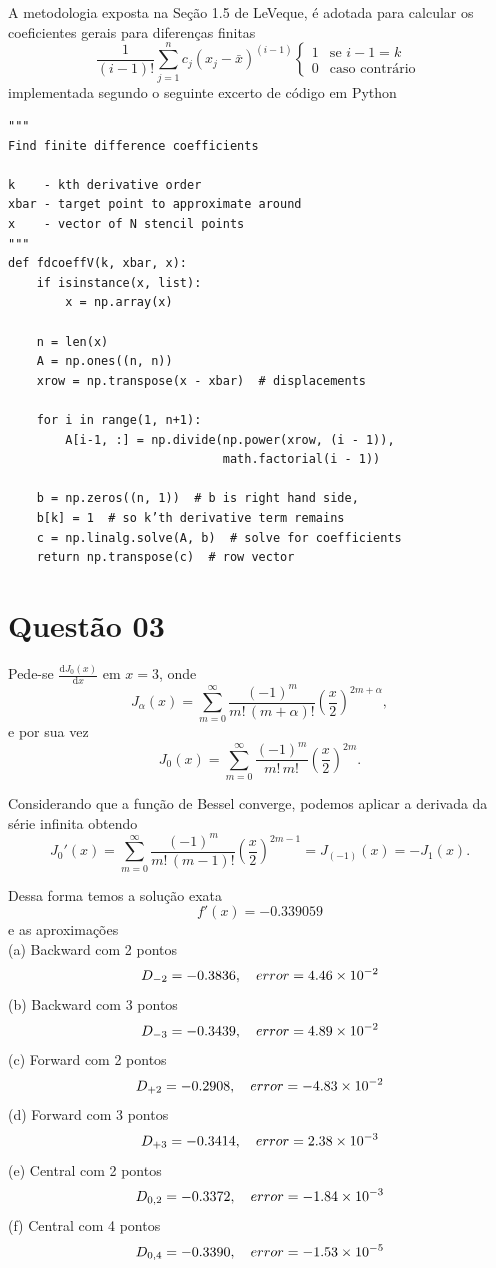 \documentclass{article}
\begin{document}
A metodologia exposta na Seção 1.5 de LeVeque\cite{leveque}, é adotada para calcular os coeficientes gerais para diferenças finitas
\begin{equation}\label{eq:leveque_coeffs}
\frac{1}{(i-1)!}\sum_{j=1}^n c_j(x_j-\bar{x})^{(i-1)}\begin{cases}
			1 &\text{se $i-1 = k$} \\
                        0 &\text{caso contrário}\
                    \end{cases}
\end{equation}
implementada segundo o seguinte excerto de código em Python

\begin{lstlisting}
"""
Find finite difference coefficients

k    - kth derivative order
xbar - target point to approximate around
x    - vector of N stencil points
"""
def fdcoeffV(k, xbar, x):
    if isinstance(x, list):
        x = np.array(x)

    n = len(x)
    A = np.ones((n, n))
    xrow = np.transpose(x - xbar)  # displacements

    for i in range(1, n+1):
        A[i-1, :] = np.divide(np.power(xrow, (i - 1)),
                              math.factorial(i - 1))

    b = np.zeros((n, 1))  # b is right hand side,
    b[k] = 1  # so k’th derivative term remains
    c = np.linalg.solve(A, b)  # solve for coefficients
    return np.transpose(c)  # row vector

\end{lstlisting}

\section{Questão 03}

Pede-se $\frac{\mathrm{d}J_0(x)}{\mathrm{d}x}$ em $x=3$, onde 
\[J_\alpha(x) = \sum_{m=0}^\infty \frac{(-1)^m}{m!\, (m+\alpha)!} {\left(\frac{x}{2}\right)}^{2m+\alpha},\]
e por sua vez
\[J_0(x) = \sum_{m=0}^\infty \frac{(-1)^m}{m!\, m!} {\left(\frac{x}{2}\right)}^{2m}.\]

Considerando que a função de Bessel converge, podemos aplicar a derivada da série infinita obtendo
\[J_0'(x) = \sum_{m=0}^\infty \frac{(-1)^m}{m!\, (m-1)!} {\left(\frac{x}{2}\right)}^{2m-1} = J_{(-1)}(x) = -J_1(x).\]

Dessa forma temos a solução exata
\[
 f'(x) = -0.339059
 \]
 e as aproximações\\
(a) Backward com 2 pontos
\[D_{-2} = -0.3836, \quad error = \num{4.46E-02} \]
(b) Backward com 3 pontos
\[D_{-3} = -0.3439, \quad error = \num{4.89E-02} \]
(c) Forward com 2 pontos
\[D_{+2} = -0.2908, \quad error = \num{-4.83E-02} \]
(d) Forward com 3 pontos
\[D_{+3} = -0.3414, \quad error = \num{2.38E-03} \]
(e) Central com 2 pontos
\[D_{0, 2} = -0.3372, \quad error = \num{-1.84E-03} \]
(f) Central com 4 pontos
\[D_{0, 4} = -0.3390, \quad error = \num{-1.53E-05} \]
\end{document}
